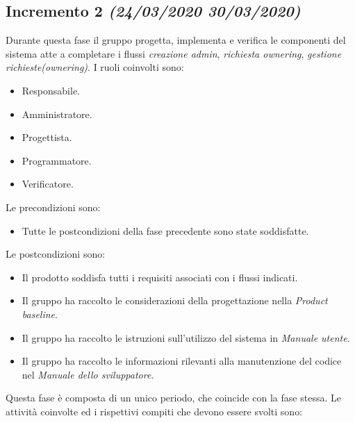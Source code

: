 \documentclass[../piano-di-progetto.tex]{subfiles}
\begin{document}
\subsection[Incremento 2]{Incremento 2 {\normalsize\normalfont\itshape(24/03/2020  30/03/2020)}}%
\label{sub:incremento_2}
Durante questa fase il gruppo progetta, implementa e verifica le componenti del sistema atte a completare i flussi \textit{creazione admin}, \textit{richiesta ownering}, \textit{gestione richieste(ownering)}.
I ruoli coinvolti sono:
\begin{itemize}
  \item Responsabile.
  \item Amministratore.
  \item Progettista.
  \item Programmatore.
  \item Verificatore.
\end{itemize}
Le precondizioni sono:
\begin{itemize}
  \item Tutte le postcondizioni della fase precedente sono state soddisfatte.
\end{itemize}
Le postcondizioni sono:
\begin{itemize}
  \item Il prodotto soddisfa tutti i requisiti associati con i flussi indicati.
  \item Il gruppo ha raccolto le considerazioni della progettazione nella \textit{Product baseline}.
  \item Il gruppo ha raccolto le istruzioni sull'utilizzo del sistema in \textit{Manuale utente}.
  \item Il gruppo ha raccolto le informazioni rilevanti alla manutenzione del codice nel \textit{Manuale dello sviluppatore}.
\end{itemize}
Questa fase è composta di un unico periodo, che coincide con la fase stessa.
Le attività coinvolte ed i rispettivi compiti che devono essere svolti sono:
\end{document}
